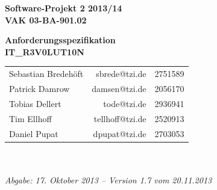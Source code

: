 \documentclass[fontsize=12pt,paper=a4,twoside]{scrartcl}
\begin{document}
\thispagestyle{fancy} \fancyhead[LO,RE]{ }  \fancyfoot[C]{}

\vspace{3cm} 
\begin{minipage}
	[H]{ 
	\textwidth} 
	\begin{center}
		\bf \Large Software-Projekt 2 2013/14\\
		\smallskip \small VAK 03-BA-901.02\\
		\vspace{3cm} 
	\end{center}
\end{minipage}
\begin{minipage}
	[H]{ 
	\textwidth} 
	\begin{center}
		\vspace{1cm} \bf \Large Anforderungsspezifikation\\
		\vspace{3ex} \small IT\_R3V0LUT10N\\
		\vfill 
	\end{center}
\end{minipage}
\vfill 
\begin{minipage}
	[H]{ 
	\textwidth} 
	\begin{center}
		\sf 
		\begin{tabular}
			{lrr} Sebastian Bredehöft & sbrede@tzi.de & 2751589\\
			Patrick Damrow & damsen@tzi.de & 2056170\\
			Tobias Dellert & tode@tzi.de & 2936941\\
			Tim Ellhoff & tellhoff@tzi.de & 2520913\\
			Daniel Pupat & dpupat@tzi.de & 2703053\\
		\end{tabular}
		\\
		~ \vspace{2cm} \\
		\it Abgabe: 17. Oktober 2013 -- Version 1.7 vom 20.11.2013 \\
		~ 
	\end{center}
\end{minipage}

\newpage

\thispagestyle{fancy} \fancyhead{}   \fancyfoot{} 
\renewcommand{\headrulewidth}{0.4pt} 
\tableofcontents
\newpage
\listoffigures
\end{document}
